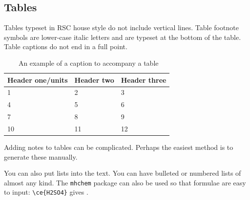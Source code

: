 \documentclass[8.5pt,twoside,twocolumn]{article}
\begin{document}
\subsection{Tables}
Tables typeset in RSC house style do not include vertical lines. Table footnote symbols are lower-case italic letters and are typeset at the bottom of the table. Table captions do not end in a full point.


\begin{table}[h]
\small
  \caption{\ An example of a caption to accompany a table}
  \label{tbl:example}
  \begin{tabular*}{0.5\textwidth}{@{\extracolsep{\fill}}lll}
    \hline
    Header one/units & Header two & Header three \\
    \hline
    1 & 2 & 3 \\
    4 & 5 & 6 \\
    7 & 8 & 9 \\
    10 & 11 & 12 \\
    \hline
  \end{tabular*}
\end{table}

Adding notes to tables can be complicated.  Perhaps the easiest
method is to generate these manually.


You can also put lists into the text. You can have bulleted or numbered lists of almost any kind. 
The \texttt{mhchem} package can also be used so
that formulae are easy to input: \texttt{\textbackslash ce\{H2SO4\}} gives . 
\end{document}
